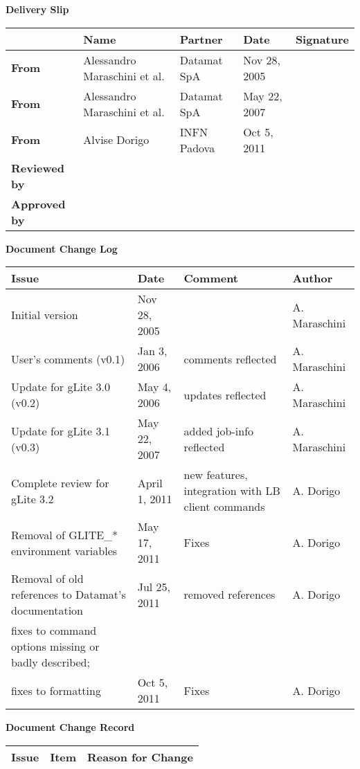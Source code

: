 \begin{center}
{\bf Delivery Slip}
\end{center}
\begin{tabularx}{\textwidth}{|l|l|l|X|X|}
\hline
           & {\bf Name} & {\bf Partner} & {\bf Date} & {\bf Signature} \\
\hline
{\bf From} & Alessandro Maraschini et al. & Datamat SpA & Nov 28, 2005& \\
\hline
{\bf From} & Alessandro Maraschini et al. & Datamat SpA & May 22, 2007& \\
\hline
{\bf From} & Alvise Dorigo		  & INFN Padova & Oct 5, 2011& \\
\hline
{\bf Reviewed by} & & & & \\

\hline
{\bf Approved by} & & & & \\
\hline
\end{tabularx}

\begin{center}
{\bf Document Change Log}
\end{center}

\begin{tabularx}{\textwidth}{|l|l|X|X|}
\hline
{\bf Issue } & {\bf Date  } & {\bf Comment } & {\bf Author  } \\   \hline
Initial version & Nov 28, 2005 & & A. Maraschini \\ \hline
User's comments (v0.1) & Jan 3, 2006 & comments reflected & A. Maraschini \\ \hline
Update for gLite 3.0 (v0.2) & May 4, 2006 & updates reflected & A. Maraschini \\ \hline
Update for gLite 3.1 (v0.3) & May 22, 2007 & added job-info reflected & A. Maraschini \\ \hline
Complete review for gLite 3.2 						       & April 1, 2011 & new features, integration with LB client commands & A. Dorigo \\ \hline
Removal of GLITE\_* environment variables  & May 17, 2011  & Fixes						   & A. Dorigo \\ \hline
Removal of old references to Datamat's documentation & Jul 25, 2011 & removed references & A. Dorigo \\ \hline
fixes to command options missing or badly described;\\ fixes to formatting & Oct 5, 2011 & Fixes & A. Dorigo \\ \hline
\hline
\end{tabularx}

\begin{center}
{\bf Document Change Record}
\end{center}

\begin{tabularx}{\textwidth}{|l|l|X|}
\hline
{\bf Issue } & {\bf Item  } & {\bf Reason for Change } \\   \hline


\hline
\end{tabularx}


